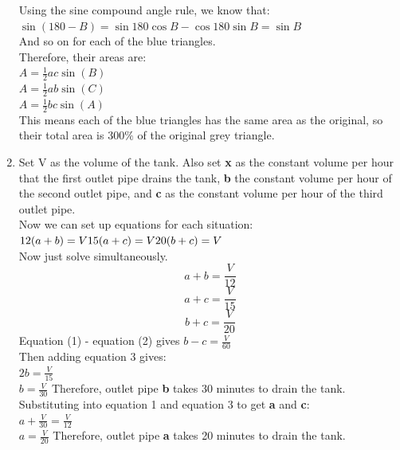 \documentclass[../main.tex]{subfiles}
\begin{document}
\begin{enumerate}
    Using the sine compound angle rule, we know that:\\
    \(\sin{(180-B)}=\sin{180}\cos{B}-\cos{180}\sin{B}=\sin{B}\)\\
    And so on for each of the blue triangles.\\
    Therefore, their areas are:\\
    \(A=\frac{1}{2}ac\sin{(B)}\)\\
    \(A=\frac{1}{2}ab\sin{(C)}\)\\
    \(A=\frac{1}{2}bc\sin{(A)}\)\\

    This means each of the blue triangles has the same area as the original, so their total area is 300\(\%\) of the original grey triangle.\\
    
    \item 
    Set V as the volume of the tank. Also set \textbf{x} as the constant volume per hour that the first outlet pipe drains the tank, \textbf{b} the constant volume per hour of the second outlet pipe, and \textbf{c} as the constant volume per hour of the third outlet pipe.\\
    Now we can set up equations for each situation:\\
    \(12(a+b)=V\\
    15(a+c)=V\\
    20(b+c)=V\)\\
    Now just solve simultaneously.\\
    \begin{equation}
        a+b=\frac{V}{12}
    \end{equation}
    \begin{equation}
       a+c=\frac{V}{15} 
    \end{equation}
    \begin{equation}
      b+c=\frac{V}{20}  
    \end{equation}
    Equation (1) - equation (2) gives \(b-c=\frac{V}{60}\)\\
    Then adding equation 3 gives:\\
    \(2b=\frac{V}{15}\)\\
    \(b=\frac{V}{30}\) Therefore, outlet pipe \textbf{b} takes 30 minutes to drain the tank.\\

    Substituting into equation 1 and equation 3 to get \textbf{a} and \textbf{c}:\\
    \(a+\frac{V}{30}=\frac{V}{12}\)\\
    \(a=\frac{V}{20}\) Therefore, outlet pipe \textbf{a} takes 20 minutes to drain the tank.\\


\end{enumerate}
\end{document}
